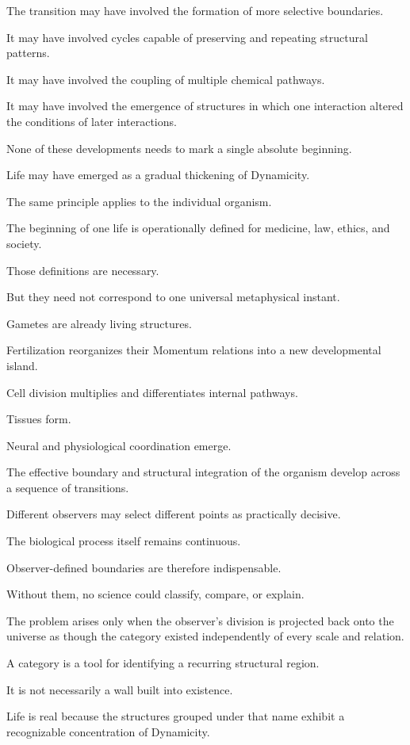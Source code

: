 The transition may have involved the formation of more selective boundaries.

It may have involved cycles capable of preserving and repeating structural patterns.

It may have involved the coupling of multiple chemical pathways.

It may have involved the emergence of structures in which one interaction altered the conditions of later interactions.

None of these developments needs to mark a single absolute beginning.

Life may have emerged as a gradual thickening of Dynamicity.

The same principle applies to the individual organism.

The beginning of one life is operationally defined for medicine, law, ethics, and society.

Those definitions are necessary.

But they need not correspond to one universal metaphysical instant.

Gametes are already living structures.

Fertilization reorganizes their Momentum relations into a new developmental island.

Cell division multiplies and differentiates internal pathways.

Tissues form.

Neural and physiological coordination emerge.

The effective boundary and structural integration of the organism develop across a sequence of transitions.

Different observers may select different points as practically decisive.

The biological process itself remains continuous.

Observer-defined boundaries are therefore indispensable.

Without them, no science could classify, compare, or explain.

The problem arises only when the observer’s division is projected back onto the universe as though the category existed independently of every scale and relation.

A category is a tool for identifying a recurring structural region.

It is not necessarily a wall built into existence.

Life is real because the structures grouped under that name exhibit a recognizable concentration of Dynamicity.

